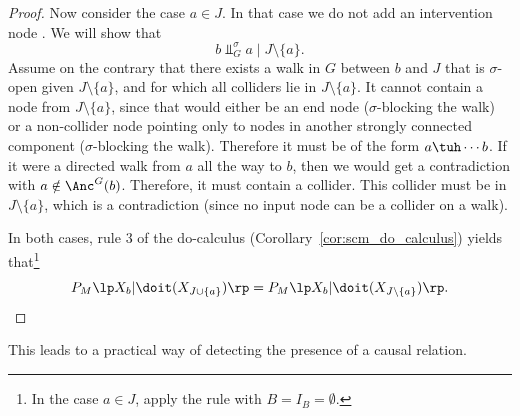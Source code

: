 \begin{proof}
  Now consider the case $a \in J$. In that case we do not add an intervention node . We will show that
  $$b \Perp^\sigma_{G} a \mid J \setminus \{a\}.$$
  Assume on the contrary that there exists a walk in $G$ between $b$ and $J$ that is $\sigma$-open given $J \setminus \{a\}$, and for which all colliders lie in $J \setminus \{a\}$. 
  It cannot contain a node from $J \setminus \{a\}$, since that would either be an end node ($\sigma$-blocking the walk) or a non-collider node pointing only to nodes in another strongly connected component ($\sigma$-blocking the walk).
  Therefore it must be of the form $a \tuh \cdots b$.
  If it were a directed walk from $a$ all the way to $b$, then we would get a contradiction with $a \notin \Anc^G(b)$.
  Therefore, it must contain a collider.
  This collider must be in $J \setminus \{a\}$, which is a contradiction (since no input node can be a collider on a walk).

  In both cases, rule 3 of the do-calculus (Corollary~\ref{cor:scm_do_calculus}) yields that\footnote{In the case $a \in J$, apply the rule with $B = I_B = \emptyset$. }
    \[ P_{M}\lp X_b|\doit(X_{J\cup \{a\}}) \rp = P_{M}\lp X_b|\doit(X_{J\setminus\{a\}}) \rp.\]
\end{proof}
This leads to a practical way of detecting the presence of a causal relation.
%
